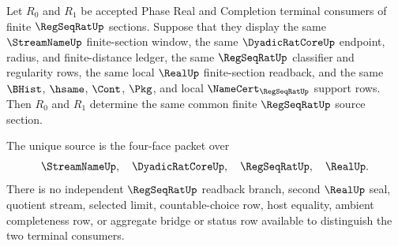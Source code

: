 \begin{theorem}
\label{thm:regseqrat-terminal-four-face-source-uniqueness}
Let $R_0$ and $R_1$ be accepted Phase Real and Completion terminal consumers
of finite $\RegSeqRatUp$ sections. Suppose that they display the same
$\StreamNameUp$ finite-section window, the same $\DyadicRatCoreUp$ endpoint,
radius, and finite-distance ledger, the same $\RegSeqRatUp$ classifier and
regularity rows, the same local $\RealUp$ finite-section readback, and the
same $\BHist$, $\hsame$, $\Cont$, $\Pkg$, and local
$\NameCert_{\RegSeqRatUp}$ support rows. Then $R_0$ and $R_1$ determine the
same common finite $\RegSeqRatUp$ source section.

The unique source is the four-face packet over
$$
\StreamNameUp,\quad \DyadicRatCoreUp,\quad \RegSeqRatUp,\quad \RealUp.
$$
There is no independent $\RegSeqRatUp$ readback branch, second $\RealUp$ seal,
quotient stream, selected limit, countable-choice row, host equality, ambient
completeness row, or aggregate bridge or status row available to distinguish
the two terminal consumers.
\end{theorem}
